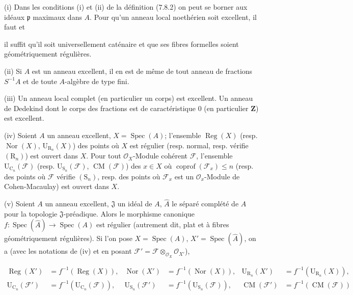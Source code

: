 \begin{scholium}[7.8.3]
\label{IV.2.s7.8.3-fr}
(i) Dans les conditions (i) et (ii) de la définition (7.8.2) on peut se borner
aux idéaux $\mathfrak p$ maximaux dans $A$. Pour qu'un anneau local noethérien
soit excellent, il faut et


il suffit qu'il soit universellement caténaire et que ses fibres formelles
soient géométriquement régulières.

(ii) Si $A$ est un anneau excellent, il en est de même de tout anneau de
fractions $S^{-1}A$ et de toute $A$-algèbre de type fini.

(iii) Un anneau local complet (en particulier un corps) est excellent. Un
anneau de Dedekind dont le corps des fractions est de caractéristique $0$ (en
particulier $\mathbf Z$) est excellent.

(iv) Soient $A$ un anneau excellent, $X=\operatorname{Spec}(A)$; l'ensemble
$\operatorname{Reg}(X)$ (resp. $\operatorname{Nor}(X)$,
$\mathrm U_{\mathrm R_n}(X)$) des points où $X$ est régulier (resp. normal,
resp. vérifie $(\mathrm R_n)$) est ouvert dans $X$. Pour tout
$\mathcal O_X$-Module cohérent $\mathcal F$, l'ensemble
$\mathrm U_{\mathrm C_n}(\mathcal F)$ (resp.
$\mathrm U_{\mathrm S_n}(\mathcal F)$, $\operatorname{CM}(\mathcal F)$) des
$x\in X$ où $\operatorname{coprof}(\mathcal F_x)\leq n$ (resp. des points où
$\mathcal F$ vérifie $(\mathrm S_n)$, resp. des points où $\mathcal F_x$ est un
$\mathcal O_x$-Module de Cohen-Macaulay) est ouvert dans $X$.

(v) Soient $A$ un anneau excellent, $\mathfrak J$ un idéal de $A$,
$\widehat A$ le séparé complété de $A$ pour la topologie $\mathfrak J$-préadique.
Alors le morphisme canonique
$f:\operatorname{Spec}(\widehat A)\to\operatorname{Spec}(A)$ est régulier
(autrement dit, plat et à fibres géométriquement régulières). Si l'on pose
$X=\operatorname{Spec}(A)$, $X'=\operatorname{Spec}(\widehat A)$, on a (avec
les notations de (iv) et en posant
$\mathcal F'=\mathcal F\otimes_{\mathcal O_X}\mathcal O_{X'}$),
\begin{env}[7.8.3.1]
\label{IV.2.s7.8.3.1-fr}
\begin{align*}
\operatorname{Reg}(X')&=f^{-1}(\operatorname{Reg}(X)),&
\operatorname{Nor}(X')&=f^{-1}(\operatorname{Nor}(X)),&
\mathrm U_{\mathrm R_n}(X')&=f^{-1}(\mathrm U_{\mathrm R_n}(X)),\\
\mathrm U_{\mathrm C_n}(\mathcal F')&=f^{-1}(\mathrm U_{\mathrm C_n}(\mathcal F)),&
\mathrm U_{\mathrm S_n}(\mathcal F')&=f^{-1}(\mathrm U_{\mathrm S_n}(\mathcal F)),&
\operatorname{CM}(\mathcal F')&=f^{-1}(\operatorname{CM}(\mathcal F))
\end{align*}
\end{env}


\end{scholium}
